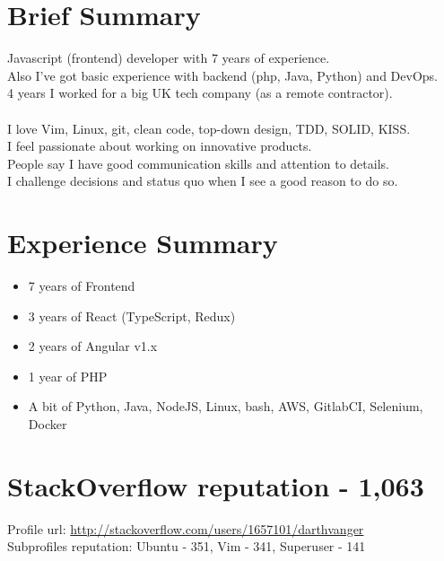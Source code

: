 \documentclass[a4paper, 14pt]{article}
\begin{document}
\begin{center}
	\textsc{\Huge{}}
\end{center}


\section{Brief Summary}
  Javascript (frontend) developer with 7 years of experience.  \\
  Also I've got basic experience with backend (php, Java, Python) and DevOps.  \\
  4 years I worked for a big UK tech company (as a remote contractor). \\
  \\
  I love Vim, Linux, git, clean code, top-down design, TDD, SOLID, KISS. \\
  I feel passionate about working on innovative products. \\
  People say I have good communication skills and attention to details. \\
  I challenge decisions and status quo when I see a good reason to do so.

\section{Experience Summary}
  \begin{itemize}
    \item 7 years of Frontend  \\
    \item 3 years of React (TypeScript, Redux) \\
    \item 2 years of Angular v1.x \\ 
    \item 1 year of PHP \\
    \item A bit of Python, Java, NodeJS, Linux, bash, AWS, GitlabCI, Selenium, Docker
  \end{itemize}

\section{StackOverflow reputation - 1,063}
  Profile url: \url{http://stackoverflow.com/users/1657101/darthvanger} \\
  Subprofiles reputation: Ubuntu - 351, Vim - 341, Superuser - 141
\end{document}
